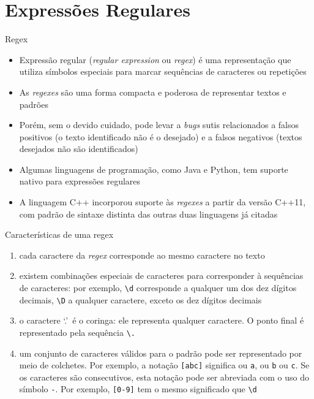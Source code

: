 \section{Expressões Regulares}

\begin{frame}[fragile]{Regex}

    \begin{itemize}
        \item Expressão regular (\textit{regular expression} ou \textit{regex}) é uma 
            representação que utiliza símbolos especiais para marcar sequências de caracteres 
            ou repetições

        \item As \textit{regexes} são uma forma compacta e poderosa de representar textos e padrões

        \item Porém, sem o devido cuidado, pode levar a \textit{bugs} sutis relacionados a falsos 
            positivos (o texto identificado não é o desejado) e a falsos negativos 
            (textos desejados não são identificados)

        \item Algumas linguagens de programação, como Java e Python, tem suporte nativo para 
            expressões regulares

        \item A linguagem C++ incorporou suporte às \textit{regexes} a partir da versão C++11, 
            com padrão de sintaxe distinta das outras duas linguagens já citadas
    \end{itemize}

\end{frame}

\begin{frame}[fragile]{Características de uma regex}

    \begin{enumerate}
        \item cada caractere da \textit{regex} corresponde ao mesmo caractere no texto
        \item existem combinações especiais de caracteres para corresponder à sequências de caracteres: por exemplo, \verb|\d| corresponde a qualquer um dos dez dígitos decimais, \verb|\D| a qualquer caractere, exceto os dez dígitos decimais
        \item o caractere \lq .\rq\ é o coringa: ele representa qualquer caractere. O ponto final é representado pela sequência \verb|\.|
        \item um conjunto de caracteres válidos para o padrão pode ser representado por meio de colchetes. Por exemplo, a notação \verb|[abc]| significa ou \texttt{a}, ou \texttt{b} ou \texttt{c}. Se os caracteres são consecutivos, esta notação pode ser abreviada com o uso do símbolo \texttt{-}. Por exemplo, \verb|[0-9]| tem o mesmo significado que \verb|\d|
    \end{enumerate}

\end{frame}

